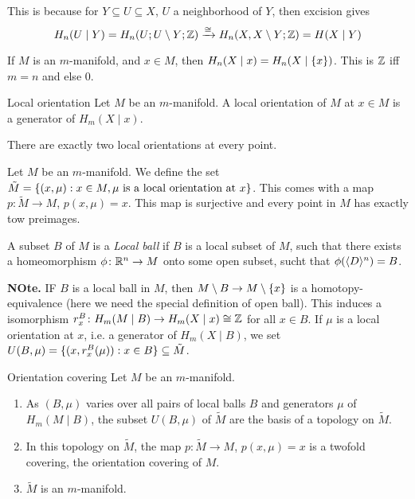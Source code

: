 \documentclass[language=english]{TemplateLecture}
\begin{document}
This is because for \(Y \subseteq U \subseteq X\), \(U\) a neighborhood of \(Y\), then excision gives
\[H_n(U \mid Y) = H_n(U ; U\setminus Y; \mathbb{Z}) \xrightarrow{\cong} H_n(X, X\setminus Y; \mathbb{Z}) = H(X \mid Y)\]

If \(M\) is an \(m\)-manifold, and \(x \in M\), then \(H_n(X \mid x) = H_n(X \mid \{x\})\). This is \(\mathbb{Z}\) iff \(m = n\) and else \(0\).

\begin{defi}{Local orientation}{}
    Let \(M\) be an \(m\)-manifold. A local orientation of \(M\) at  \(x \in M\) is a generator of \(H_m(X \mid x)\).
\end{defi}

There are exactly two local orientations at every point.

\begin{construction}
    Let \(M\) be an \(m\)-manifold. We define the set \(\tilde M = \{(x, \mu) : x \in M, \mu \text{ is a local orientation at } x\}\). This comes with a map \(p \colon \tilde M \to M\), \(p(x, \mu) = x\). This map is surjective and every point in \(M\) has exactly tow preimages.

    A subset \(B\) of \(M\) is a \emph{Local ball} if \(B\) is a local subset of \(M\), such that there exists a homeomorphism \(\phi \colon \mathbb{R}^n \to M\) onto some open subset, sucht that \(\phi(\langle D\rangle^n) = B\).

    \textbf{NOte.} IF \(B\) is a local ball in \(M\), then \(M\setminus B \to M \setminus \{x\}\) is a homotopy-equivalence (here we need the special definition of open ball). This induces a isomorphism \(r_x^B\colon H_m(M \mid B) \to H_m(X \mid x) \cong \mathbb{Z}\) for all \(x \in B\).
    If \(\mu\) is a local orientation at \(x\), i.e. a generator of \(H_m(X \mid B)\), we set \(U(B, \mu) = \{(x, r_x^B(\mu)) : x \in B\} \subseteq \tilde M\).
\end{construction}

\begin{thm}{Orientation covering}{}
    Let \(M\) be an \(m\)-manifold.
    \begin{enumerate}
        \item As \((B, \mu)\) varies over all pairs of local balls \(B\) and generators \(\mu\) of \(H_m(M \mid B)\), the subset \(U(B, \mu)\) of \(\tilde M\) are the basis of a topology on \(\tilde M\).
        \item In this topology on \(\tilde M\), the map \(p \colon \tilde M \to M\), \(p(x, \mu) = x\) is a twofold covering, the orientation covering of \(M\). 
        \item \(\tilde M\) is an \(m\)-manifold.
    \end{enumerate}
\end{thm}
\end{document}
